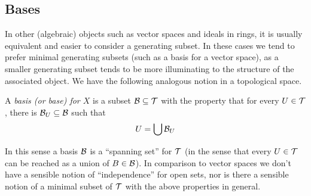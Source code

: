 \documentclass[11pt]{article}
\begin{document}
\subsection{Bases}
In other (algebraic) objects such as vector spaces and ideals in rings, it is usually equivalent and easier to consider a generating subset. In these cases we tend to prefer minimal generating subsets (such as a basis for a vector space), as a smaller generating subset tends to be more illuminating to the structure of the associated object. We have the following analogous notion in a topological space.
\begin{definition}[Basis]
    A \emph{basis (or base) for $X$} is a subset $\mathcal{B} \subseteq \mathcal{T}$ with the property that for every $U \in \mathcal{T}$, there is $\mathcal{B}_U \subseteq \mathcal{B}$ such that
    $$
        U = \bigcup \mathcal{B}_U
    $$
\end{definition}
In this sense a basis $\mathcal{B}$ is a ``spanning set'' for $\mathcal{T}$ (in the sense that every $U \in \mathcal{T}$ can be reached as a union of $B \in \mathcal{B}$). In comparison to vector spaces we don't have a sensible notion of ``independence'' for open sets, nor is there a sensible notion of a minimal subset of $\mathcal{T}$ with the above properties in general.
\end{document}
